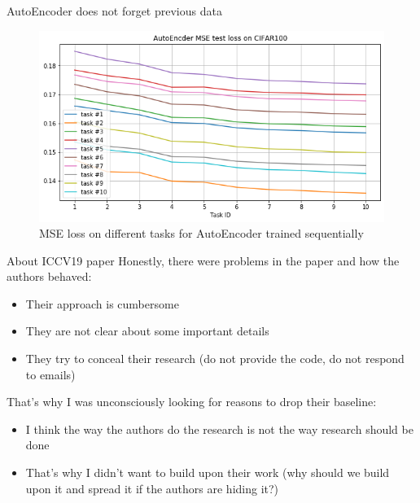 \documentclass[10pt]{beamer}
\begin{document}
\begin{frame}{AutoEncoder does not forget previous data}
    \begin{figure}
        \centering
        \includegraphics[width=\textwidth]{images/autoencoder-lll}
        \caption{MSE loss on different tasks for AutoEncoder trained sequentially}
    \end{figure}
\end{frame}

\begin{frame}{About ICCV19 paper}
    Honestly, there were problems in the paper and how the authors behaved:
    \begin{itemize}
        \item\pause Their approach is cumbersome
        \item\pause They are not clear about some important details
        \item\pause They try to conceal their research (do not provide the code, do not respond to emails)
    \end{itemize} 
    
    That's why I was unconsciously looking for reasons to drop their baseline:
    \begin{itemize}
        \item I think the way the authors do the research is not the way research should be done
        \item That's why I didn't want to build upon their work (why should we build upon it and spread it if the authors are hiding it?)
    \end{itemize}
\end{frame}
\end{document}
